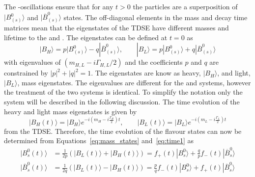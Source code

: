 {The \bsd-\barbsd oscillations ensure that for any $t>0$ the particles are a superposition of $| B^0_{(s)} \rangle$ and $| \overline{B}^0_{(s)} \rangle$ states. The off-diagonal elements in the mass and decay time matrices mean that the eigenstates of the TDSE have different masses and lifetime to the \bsd and \barbsd. The eigenstates can be defined at $t=0$ as
\begin{equation}
| B_H \rangle = p | B^0_{(s)} \rangle - q |\overline{B}^0_{(s)} \rangle, \qquad |B_L \rangle = p  | B^0_{(s)} \rangle + q | \overline{B}^0_{(s)} \rangle
\label{eq:mass_states}
\end{equation}
with eigenvalues of $(m_{H,L} - i\Gamma_{H,L}/2)$ and the coefficients $p$ and $q$ are constrained by $|p|^2 + |q|^2 = 1$. The eigenstates are know as heavy, $| B_H \rangle$, and light, $| B_L \rangle$, mass eigenstates. The eigenvalues are different for the \bd and \bs systems, however the treatment of the two systems is identical. To simplify the notation only the \bs system will be described in the following discussion.
The time evolution of the heavy and light mass eigenstates is given by
\begin{equation}
  | B_H (t)\rangle = | B_H \rangle e^{-i(m_H - i\frac{\Gamma_H}{2})t}, \qquad | B_L (t)\rangle = | B_L \rangle e^{-i(m_L - i\frac{\Gamma_L}{2})t}
\label{eq:time1}
\end{equation}
from the TDSE. Therefore, the time evolution of the flavour states can now be determined from Equations~\ref{eq:mass_states} and~\ref{eq:time1} as
\begin{align}
| B^{0}_{s}(t) \rangle &= \frac{1}{2p}\left(|B_{L}(t)\rangle + |B_{H}(t) \rangle \right)  = f_{+}(t) |B^{0}_{s} \rangle + \frac{q}{p}f_{-}(t) |\overline{B}^{0}_{s}\rangle  \label{eq:AAA}\\
| \overline{B}^{0}_{s}(t) \rangle &= \frac{1}{2q}\left(|B_{L}(t)\rangle - |B_{H}(t) \rangle \right)  = \frac{p}{q}f_{-}(t) |B^{0}_{s} \rangle+ f_{+}(t) |\overline{B}^{0}_{s}\rangle \label{eq:BBB}
\end{align}

}
